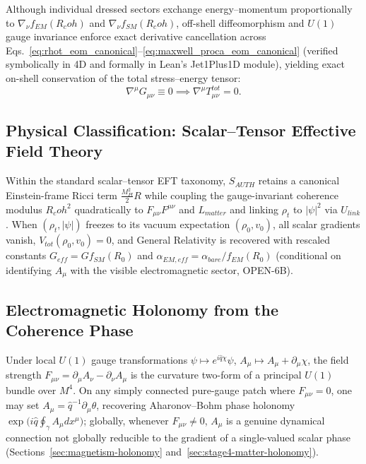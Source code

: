 \documentclass[american,11pt,letterpaper]{article}
\newcommand{\Rcoh}{R_{\mathrm{coh}}}
\def\mathcal#1{#1}%
\def\mathrm#1{#1}%
\def\texttt#1{#1}%
\def\Rcoh{R_coh}%
\begin{document}
Although individual dressed sectors exchange energy--momentum proportionally to $\nabla_\nu f_{\mathrm{EM}}(\Rcoh)$ and $\nabla_\nu f_{\mathrm{SM}}(\Rcoh)$, off-shell diffeomorphism and $U(1)$ gauge invariance enforce exact derivative cancellation across Eqs.~\eqref{eq:rhot_eom_canonical}--\eqref{eq:maxwell_proca_eom_canonical} (verified symbolically in 4D and formally in Lean's \texttt{Jet1Plus1D} module), yielding exact on-shell conservation of the total stress--energy tensor:
\begin{equation}
\nabla^\mu G_{\mu\nu} \equiv 0
\implies
\nabla^\mu T_{\mu\nu}^{\mathrm{tot}} = 0.
\label{eq:bianchi_noether_total}
\end{equation}

\subsection{Physical Classification: Scalar--Tensor Effective Field Theory}

Within the standard scalar--tensor EFT taxonomy, $S_{\mathrm{AUTH}}$ retains a canonical Einstein-frame Ricci term $\frac{M_{\mathrm{Pl}}^2}{2}R$ while coupling the gauge-invariant coherence modulus $\Rcoh^2$ quadratically to $F_{\mu\nu}F^{\mu\nu}$ and $\mathcal{L}_{\mathrm{matter}}$ and linking $\rho_t$ to $|\psi|^2$ via $U_{\mathrm{link}}$. When $(\rho_t, |\psi|)$ freezes to its vacuum expectation $(\rho_0, v_0)$, all scalar gradients vanish, $V_{\mathrm{tot}}(\rho_0, v_0) = 0$, and General Relativity is recovered with rescaled constants $G_{\mathrm{eff}} = G f_{\mathrm{SM}}(R_0)$ and $\alpha_{\mathrm{EM,eff}} = \alpha_{\mathrm{bare}}/f_{\mathrm{EM}}(R_0)$ (conditional on identifying $A_\mu$ with the visible electromagnetic sector, \texttt{OPEN-6B}).

\subsection{Electromagnetic Holonomy from the Coherence Phase}

Under local $U(1)$ gauge transformations $\psi \mapsto e^{i\hat{q}\chi}\psi$, $A_\mu \mapsto A_\mu + \partial_\mu\chi$, the field strength $F_{\mu\nu} = \partial_\mu A_\nu - \partial_\nu A_\mu$ is the curvature two-form of a principal $U(1)$ bundle over $\mathcal{M}^4$. On any simply connected pure-gauge patch where $F_{\mu\nu} = 0$, one may set $A_\mu = \hat{q}^{-1}\partial_\mu\theta$, recovering Aharonov--Bohm phase holonomy $\exp\bigl(i\hat{q}\oint_\gamma A_\mu dx^\mu\bigr)$; globally, whenever $F_{\mu\nu} \ne 0$, $A_\mu$ is a genuine dynamical connection not globally reducible to the gradient of a single-valued scalar phase (Sections~\ref{sec:magnetism-holonomy} and~\ref{sec:stage4-matter-holonomy}).
\end{document}
